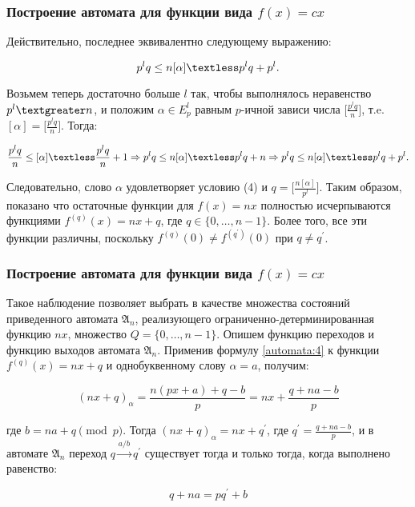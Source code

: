 \documentclass[10pt,utf8,presentation,compress]{beamer}
\begin{document}
\begin{frame}
\frametitle{Построение автомата для функции вида $f(x)=cx$}
\noindent Действительно, последнее эквивалентно следующему выражению:

\begin{equation} \label{automata:7}
p^l q \leq n[\alpha] \textless p^l q+ p^l.	
\end{equation}

\noindent Возьмем теперь достаточно больше $l$ так, чтобы выполнялось неравенство $p^l \textgreater n$, и положим $\alpha \in E^l_p$ равным $p$-ичной зависи числа $\bigg[\frac{p^l q}{n}\bigg]$, т.e. $[\alpha]=\bigg[\frac{p^l q}{n}\bigg]$. Тогда:

\begin{equation} \label{automata:8}
\frac{p^l q}{n} \leq [\alpha] \textless \frac{p^l q}{n} + 1 \Rightarrow p^l q \leq n[\alpha] \textless p^l q +n \Rightarrow p^l q \leq n[\alpha] \textless p^l q + p^l.
\end{equation}

\noindent Следовательно, слово $\alpha$ удовлетворяет условию (4) и $q=\bigg[\frac{n[\alpha]}{p^l}\bigg]$. Таким образом, показано что остаточные функции для $f(x)=nx$ полностью исчерпываются функциями $f^{(q)}(x)=nx+q$, где $q \in \{0, \ldots, n-1 \}$. Более того, все эти функции различны, поскольку $f^{(q)}(0) \neq f^{(q^{'})}(0)$ при $q \neq q^{'}$.
\end{frame}

\begin{frame}
\frametitle{Построение автомата для функции вида $f(x)=cx$}
Такое наблюдение позволяет выбрать в качестве множества состояний приведенного автомата $\mathfrak{A}_n$, реализующего ограниченно-детерминированная функцию $nx$, множество $Q=\{0, \ldots, n-1 \}$. Опишем функцию переходов и функцию выходов автомата $\mathfrak{A}_n$. Применив формулу \ref{automata:4} к функции $f^{(q)}(x)=nx+q$ и однобуквенному слову $\alpha=a$, получим:


 \begin{equation} \label{automata:9}
 (nx+q)_{\alpha}=\frac{n(px+a)+q-b}{p}=nx+\frac{q+na-b}{p}	
 \end{equation}

\noindent где $b=na+q \pmod p$. Тогда $(nx+q)_\alpha = nx + q^{'}$, где $q^{'}=\frac{q+na-b}{p}$, и в автомате $\mathfrak{A}_n$ переход $q \xrightarrow{a/b} q^{'}$ существует тогда и только тогда, когда выполнено равенство:
 
 \begin{equation} \label{automata:10}
 	q+na=pq^{'}+b
 \end{equation}
\end{frame}
\end{document}
